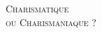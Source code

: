 \mbox{}
\vfill

\begin{center}
\Large\textsc{
Charismatique \\
ou Charismaniaque ?
}
\end{center}

\vfill
\mbox{}
\vfill
\mbox{}

